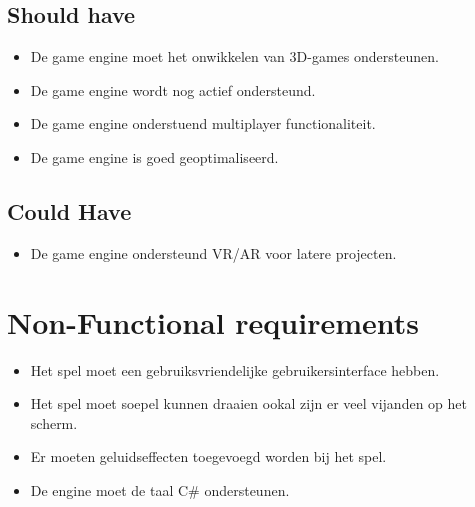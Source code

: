 \subsection{Should have}
\begin{itemize}
    \item De game engine moet het onwikkelen van 3D-games ondersteunen.
    \item De game engine wordt nog actief ondersteund.
    \item De game engine onderstuend multiplayer functionaliteit.
    \item De game engine is goed geoptimaliseerd.
\end{itemize}

\subsection{Could Have}
\begin{itemize}
    \item De game engine ondersteund VR/AR voor latere projecten.
\end{itemize}

\section{Non-Functional requirements}
\begin{itemize}
    \item Het spel moet een gebruiksvriendelijke gebruikersinterface hebben. 
    \item Het spel moet soepel kunnen draaien ookal zijn er veel vijanden op het scherm. 
    \item Er moeten geluidseffecten toegevoegd worden bij het spel.
    \item De engine moet de taal C\# ondersteunen.
\end{itemize}


